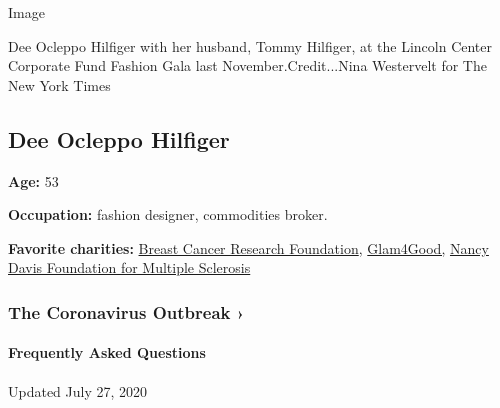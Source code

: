 Image

Dee Ocleppo Hilfiger with her husband, Tommy Hilfiger, at the Lincoln
Center Corporate Fund Fashion Gala last November.Credit...Nina
Westervelt for The New York Times

\hypertarget{dee-ocleppo-hilfiger}{%
\subsection{Dee Ocleppo Hilfiger}\label{dee-ocleppo-hilfiger}}

\textbf{Age:} 53

\textbf{Occupation:} fashion designer, commodities broker.

\textbf{Favorite charities:} \href{https://www.bcrf.org}{Breast Cancer
Research Foundation}, \href{https://glam4good.com}{Glam4Good,}
\href{https://www.erasems.org}{Nancy Davis Foundation for Multiple
Sclerosis}

\href{https://www.nytimes3xbfgragh.onion/news-event/coronavirus?action=click\&pgtype=Article\&state=default\&region=MAIN_CONTENT_3\&context=storylines_faq}{}

\hypertarget{the-coronavirus-outbreak-}{%
\subsubsection{The Coronavirus Outbreak
›}\label{the-coronavirus-outbreak-}}

\hypertarget{frequently-asked-questions}{%
\paragraph{Frequently Asked
Questions}\label{frequently-asked-questions}}

Updated July 27, 2020

